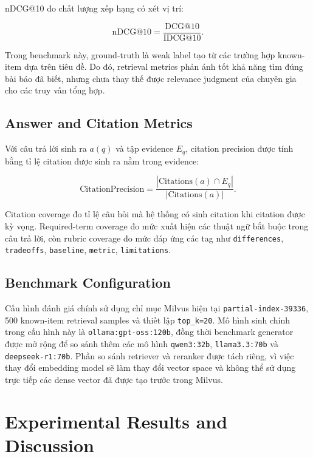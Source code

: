 \documentclass[conference]{IEEEtran}
\newcommand{\partialindex}{\texttt{partial-index-39336}}
\begin{document}
nDCG@10 đo chất lượng xếp hạng có xét vị trí:

\begin{equation}
\text{nDCG@10}=\frac{\text{DCG@10}}{\text{IDCG@10}}.
\end{equation}

Trong benchmark này, ground-truth là weak label tạo từ các trường hợp known-item dựa trên tiêu đề. Do đó, retrieval metrics phản ánh tốt khả năng tìm đúng bài báo đã biết, nhưng chưa thay thế được relevance judgment của chuyên gia cho các truy vấn tổng hợp.

\subsection{Answer and Citation Metrics}

Với câu trả lời sinh ra $a(q)$ và tập evidence $E_q$, citation precision được tính bằng tỉ lệ citation được sinh ra nằm trong evidence:

\begin{equation}
\text{CitationPrecision} = \frac{|\text{Citations}(a)\cap E_q|}{|\text{Citations}(a)|}.
\end{equation}

Citation coverage đo tỉ lệ câu hỏi mà hệ thống có sinh citation khi citation được kỳ vọng. Required-term coverage đo mức xuất hiện các thuật ngữ bắt buộc trong câu trả lời, còn rubric coverage đo mức đáp ứng các tag như \texttt{differences}, \texttt{tradeoffs}, \texttt{baseline}, \texttt{metric}, \texttt{limitations}.

\subsection{Benchmark Configuration}

Cấu hình đánh giá chính sử dụng chỉ mục Milvus hiện tại \partialindex, 500 known-item retrieval samples và thiết lập \texttt{top\_k=20}. Mô hình sinh chính trong cấu hình này là \texttt{ollama:gpt-oss:120b}, đồng thời benchmark generator được mở rộng để so sánh thêm các mô hình \texttt{qwen3:32b}, \texttt{llama3.3:70b} và \texttt{deepseek-r1:70b}. Phần so sánh retriever và reranker được tách riêng, vì việc thay đổi embedding model sẽ làm thay đổi vector space và không thể sử dụng trực tiếp các dense vector đã được tạo trước trong Milvus.

\section{Experimental Results and Discussion}
\end{document}
